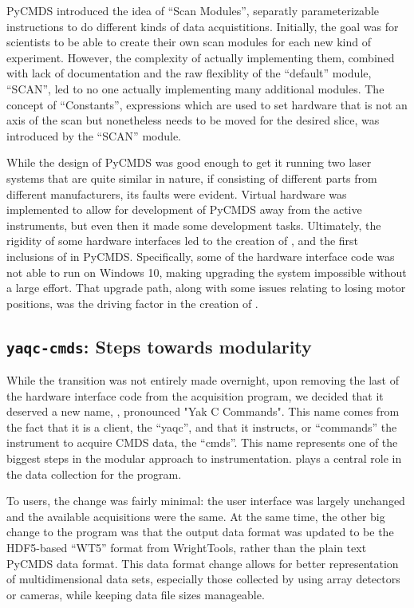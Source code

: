 PyCMDS introduced the idea of ``Scan Modules'', separatly parameterizable instructions to do different kinds of data acquistitions.
Initially, the goal was for scientists to be able to create their own scan modules for each new kind of experiment.
However, the complexity of actually implementing them, combined with lack of documentation and the raw flexiblity of the ``default'' module, ``SCAN'', led to no one actually implementing many additional modules.
The concept of ``Constants'', expressions which are used to set hardware that is not an axis of the scan but nonetheless needs to be moved for the desired slice, was introduced by the ``SCAN'' module.

While the design of PyCMDS was good enough to get it running two laser systems that are quite similar in nature, if consisting of different parts from different manufacturers, its faults were evident.
Virtual hardware was implemented to allow for development of PyCMDS away from the active instruments, but even then it made some development tasks.
Ultimately, the rigidity of some hardware interfaces led to the creation of \yaq{}, and the first inclusions of \yaq{} in PyCMDS.
Specifically, some of the hardware interface code was not able to run on Windows 10, making upgrading the system impossible without a large effort.
That upgrade path, along with some issues relating to losing motor positions, was the driving factor in the creation of \yaq{}.


\subsection{\texttt{yaqc-cmds}: Steps towards modularity}


While the transition was not entirely made overnight, upon removing the last of the hardware interface code from the acquisition program, we decided that it deserved a new name, \yaqccmds{}, pronounced "Yak C Commands".
This name comes from the fact that it is a \yaq{} client, the ``yaqc'', and that it instructs, or ``commands'' the instrument to acquire CMDS data, the ``cmds''.
This name represents one of the biggest steps in the modular approach to instrumentation.
\yaq{} plays a central role in the data collection for the program.

To users, the change was fairly minimal: the user interface was largely unchanged and the available acquisitions were the same.
At the same time, the other big change to the program was that the output data format was updated to be the HDF5-based ``WT5'' format from WrightTools, rather than the plain text PyCMDS data format.
This data format change allows for better representation of multidimensional data sets, especially those collected by using array detectors or cameras, while keeping data file sizes manageable.

